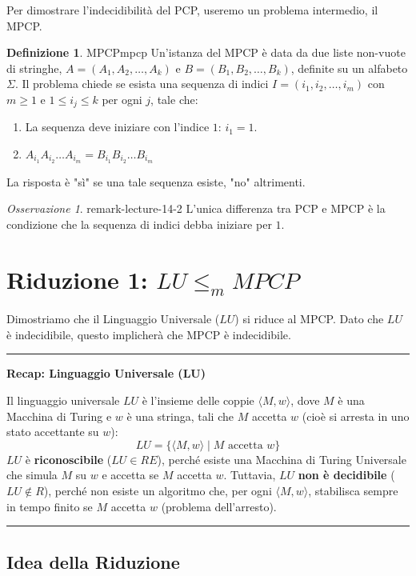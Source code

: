 \documentclass[a4paper]{article}
\theoremstyle{definition} %
\newtheorem{definition}{Definizione}
\theoremstyle{remark} %
\newtheorem{remark}{Osservazione}
\begin{document}
Per dimostrare l'indecidibilità del PCP, useremo un problema intermedio, il MPCP.

\begin{definition}{MPCP}{mpcp}
Un'istanza del MPCP è data da due liste non-vuote di stringhe, $A = (A_1, A_2, \dots, A_k)$ e $B = (B_1, B_2, \dots, B_k)$, definite su un alfabeto $\Sigma$.
Il problema chiede se esista una sequenza di indici $I = (i_1, i_2, \dots, i_m)$ con $m \ge 1$ e $1 \le i_j \le k$ per ogni $j$, tale che:
\begin{enumerate}
    \item La sequenza deve iniziare con l'indice $1$: $i_1 = 1$.
    \item $A_{i_1} A_{i_2} \dots A_{i_m} = B_{i_1} B_{i_2} \dots B_{i_m}$
\end{enumerate}
La risposta è "sì" se una tale sequenza esiste, "no" altrimenti.
\end{definition}

\begin{remark}{}{{ remark-lecture-14-2 }}
L'unica differenza tra PCP e MPCP è la condizione che la sequenza di indici debba iniziare per $1$.
\end{remark}

\section{Riduzione 1: $LU \le_m MPCP$}

Dimostriamo che il Linguaggio Universale ($LU$) si riduce al MPCP. Dato che $LU$ è indecidibile, questo implicherà che MPCP è indecidibile.

\noindent\rule{\textwidth}{0.4pt}
\textbf{Recap: Linguaggio Universale (LU)}

Il linguaggio universale $LU$ è l'insieme delle coppie $\langle M, w \rangle$, dove $M$ è una Macchina di Turing e $w$ è una stringa, tali che $M$ accetta $w$ (cioè si arresta in uno stato accettante su $w$):
\[
LU = \{ \langle M, w \rangle \mid M \text{ accetta } w \}
\]
$LU$ è \textbf{riconoscibile} ($LU \in RE$), perché esiste una Macchina di Turing Universale che simula $M$ su $w$ e accetta se $M$ accetta $w$. Tuttavia, $LU$ \textbf{non è decidibile} ($LU \notin R$), perché non esiste un algoritmo che, per ogni $\langle M, w \rangle$, stabilisca sempre in tempo finito se $M$ accetta $w$ (problema dell'arresto).
\noindent\rule{\textwidth}{0.4pt}

\subsection{Idea della Riduzione}
\end{document}
